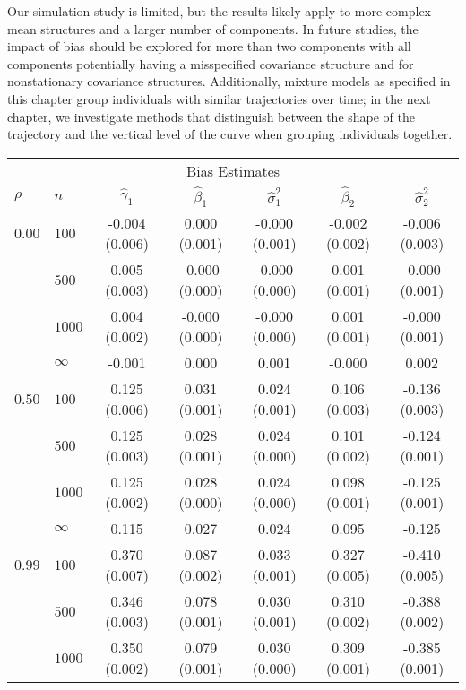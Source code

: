\documentclass[10pt]{article}
\begin{document}
Our simulation study is limited, but the results likely apply to more complex mean structures and a larger number of components. In future studies, the impact of bias should be explored for more than two components with all components potentially having a misspecified covariance structure and for nonstationary covariance structures. Additionally, mixture models as specified in this chapter group individuals with similar trajectories over time; in the next chapter, we investigate methods that distinguish between the shape of the trajectory and the vertical level of the curve when grouping individuals together.
	
	
\clearpage
\begin{table}[ht]
\begin{center}
\begin{tabular}{llccccc}
   \hline \multicolumn{7}{c}{Bias Estimates}\\ $\rho$ & $n$ & $\widehat{\gamma}_1$ & $\widehat{\beta}_1$ & $\widehat{\sigma}^2_1$ & $\widehat{\beta}_2$ & $\widehat{\sigma}^2_2$ \\ 
   \hline$0.00$ & $100$ & -0.004 (0.006) & 0.000 (0.001) & -0.000 (0.001) & -0.002 (0.002) & -0.006 (0.003) \\ 
    & $500$ & 0.005 (0.003) & -0.000 (0.000) & -0.000 (0.000) & 0.001 (0.001) & -0.000 (0.001) \\ 
    & $1000$ & 0.004 (0.002) & -0.000 (0.000) & -0.000 (0.000) & 0.001 (0.001) & -0.000 (0.001) \\ 
    & $\infty$ & -0.001 & 0.000 & 0.001 & -0.000 & 0.002 \\ 
  $0.50$ & $100$ & 0.125 (0.006) & 0.031 (0.001) & 0.024 (0.001) & 0.106 (0.003) & -0.136 (0.003) \\ 
    & $500$ & 0.125 (0.003) & 0.028 (0.001) & 0.024 (0.000) & 0.101 (0.002) & -0.124 (0.001) \\ 
    & $1000$ & 0.125 (0.002) & 0.028 (0.000) & 0.024 (0.000) & 0.098 (0.001) & -0.125 (0.001) \\ 
    & $\infty$ & 0.115 & 0.027 & 0.024 & 0.095 & -0.125 \\ 
  $0.99$ & $100$ & 0.370 (0.007) & 0.087 (0.002) & 0.033 (0.001) & 0.327 (0.005) & -0.410 (0.005) \\ 
    & $500$ & 0.346 (0.003) & 0.078 (0.001) & 0.030 (0.001) & 0.310 (0.002) & -0.388 (0.002) \\ 
    & $1000$ & 0.350 (0.002) & 0.079 (0.001) & 0.030 (0.000) & 0.309 (0.001) & -0.385 (0.001) \\ 

\end{tabular}
\end{center}
\end{table}
\end{document}

